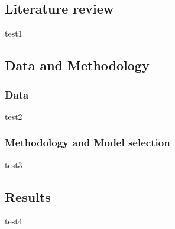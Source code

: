 \subsection{Literature review}
test1
\subsection{Data and Methodology}
\subsubsection{Data}
test2
\subsubsection{Methodology and Model selection}
test3
\subsection{Results}
test4